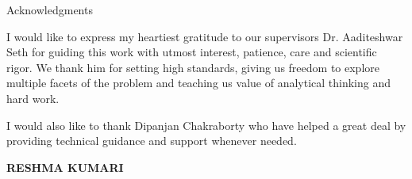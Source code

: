 \begin{center}
\LARGE{Acknowledgments} 
\end{center}

\vspace{0.5in}

I would like to express my heartiest gratitude to our supervisors Dr. Aaditeshwar Seth for guiding this work with utmost interest,
patience, care and scientific rigor. We thank him for setting high standards, giving us freedom to explore multiple facets of the problem and teaching us value of analytical thinking and hard work.

I would also like to thank Dipanjan Chakraborty who have helped a great deal by providing technical guidance and support whenever needed. 

\vspace{1.5in}

{\bfseries RESHMA KUMARI}
